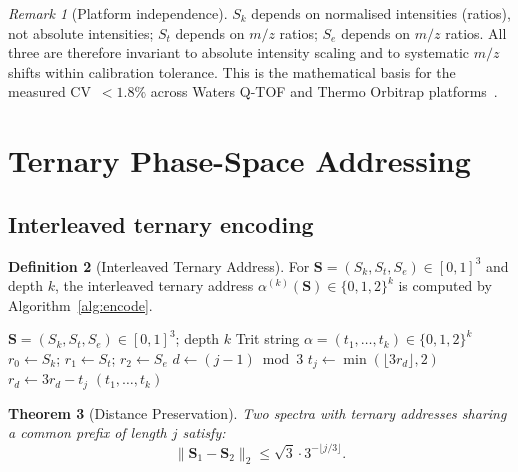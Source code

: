 \documentclass[twocolumn,10pt,a4paper]{article}
\theoremstyle{thmstyle}
\newtheorem{theorem}{Theorem}[section]
\theoremstyle{definition}
\newtheorem{definition}[theorem]{Definition}
\theoremstyle{remark}
\newtheorem{remark}[theorem]{Remark}
\newcommand{\Sv}{\mathbf{S}}
\newcommand{\Sk}{S_{k}}
\newcommand{\St}{S_{t}}
\newcommand{\Se}{S_{e}}
\begin{document}
\begin{remark}[Platform independence]
\label{rem:platform}
$\Sk$ depends on normalised intensities (ratios), not absolute
intensities; $\St$ depends on $m/z$ ratios; $\Se$ depends on $m/z$
ratios. All three are therefore invariant to absolute intensity
scaling and to systematic $m/z$ shifts within calibration tolerance.
This is the mathematical basis for the measured CV~$< 1.8\%$ across
Waters Q-TOF and Thermo Orbitrap
platforms~\citep{sachikonye2024categorical}.
\end{remark}


\section{Ternary Phase-Space Addressing}
\label{sec:embedding}

\subsection{Interleaved ternary encoding}

\begin{definition}[Interleaved Ternary Address]
\label{def:ternary}
For $\Sv = (\Sk, \St, \Se) \in [0,1]^3$ and depth $k$, the
interleaved ternary address $\alpha^{(k)}(\Sv) \in \{0,1,2\}^k$ is
computed by Algorithm~\ref{alg:encode}.
\end{definition}

\begin{algorithm}[h]
\caption{Interleaved Ternary Encoder}
\label{alg:encode}
\begin{algorithmic}[1]
\Require $\Sv = (\Sk,\St,\Se) \in [0,1]^3$; depth $k$
\Ensure Trit string $\alpha = (t_1,\ldots,t_k) \in \{0,1,2\}^k$
\State $r_0 \gets \Sk$;\; $r_1 \gets \St$;\; $r_2 \gets \Se$
  \State $d \gets (j-1) \bmod 3$
  \State $t_j \gets \min(\lfloor 3 r_d \rfloor, 2)$
  \State $r_d \gets 3 r_d - t_j$
\EndFor
\Return $(t_1, \ldots, t_k)$
\end{algorithmic}
\end{algorithm}

\begin{theorem}[Distance Preservation]
\label{thm:distance}
Two spectra with ternary addresses sharing a common prefix of length
$j$ satisfy:
\begin{equation}
\|\Sv_1 - \Sv_2\|_2 \le \sqrt{3} \cdot 3^{-\lfloor j/3 \rfloor}.
\label{eq:distance-bound}
\end{equation}
\end{theorem}
\end{document}
